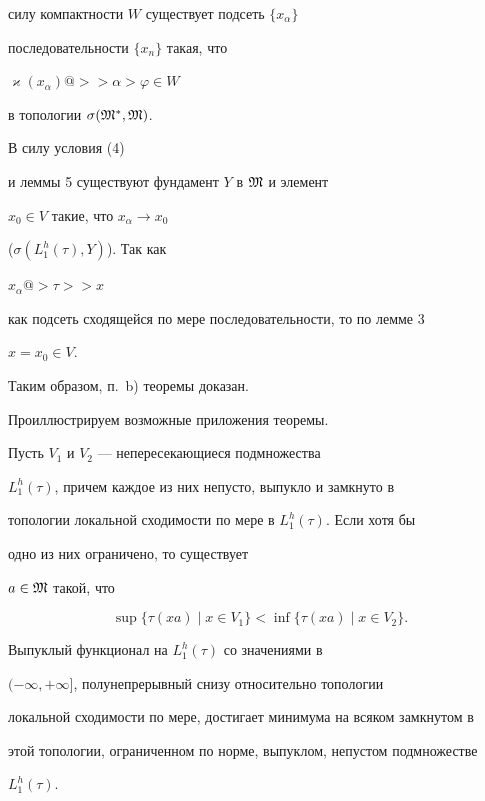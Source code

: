 \begin{pf}
силу компактности $W$ существует подсеть $\{x_{\alpha}\}$ 


последовательности $\{x_n\}$ такая, что 


$\varkappa (x_{\alpha}) @>>{\alpha}> \varphi \in W$ 


в топологии $\sigma ({\frak M}^*, {\frak M})$.


В силу условия (4)


и леммы 5 существуют фундамент $Y$ в $\frak M$ и элемент 


$x_0 \in V$ такие, что $x_{\alpha} \to x_0$ 


($\sigma (L_1^h (\tau), Y)$). Так как 


$x_{\alpha}@>{\tau}>> x$ 


как подсеть сходящейся по мере последовательности, то по лемме 3 


$x=x_0 \in V$. 


\smallskip





Таким образом, п.~b) теоремы доказан.


\end{pf}





Проиллюстрируем возможные приложения теоремы. 





\begin{cor}


Пусть $V_1$ и $V_2$ --- непересекающиеся подмножества 


$L_1^h (\tau)$, причем каждое из них непусто, выпукло и замкнуто в 


топологии локальной сходимости по мере в $L_1^h (\tau)$. Если хотя бы 


одно из них ограничено, то существует 


$a \in {\frak M}$ такой, что


$$


\sup \{\tau (xa) \mid x \in V_1\} < 


\inf \{\tau (xa) \mid x \in V_2\}.


$$


\end{cor}





\begin{cor}


Выпуклый функционал на $L_1^h (\tau)$ со значениями в 


$(-\infty, +\infty]$, полунепрерывный снизу относительно топологии 


локальной сходимости по мере, достигает минимума на всяком замкнутом в 


этой топологии, ограниченном по норме, выпуклом, непустом подмножестве 


$L_1^h (\tau)$.


\end{cor}





